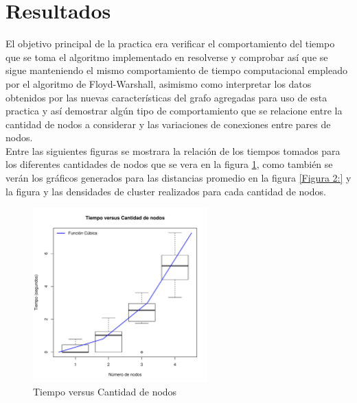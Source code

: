 \documentclass[12pt]{article}
\begin{document}
\section{Resultados}
El objetivo principal de la practica era verificar el comportamiento del tiempo que se toma el algoritmo implementado en resolverse y comprobar así que se sigue manteniendo el mismo comportamiento de tiempo computacional empleado por el algoritmo de Floyd-Warshall, asimismo como interpretar los datos obtenidos por las nuevas características del grafo agregadas para uso de esta practica y así demostrar algún tipo de comportamiento que se relacione entre la cantidad de nodos a considerar y las variaciones de conexiones entre pares de nodos.\\
Entre las siguientes figuras se mostrara la relación de los tiempos tomados para los diferentes cantidades de nodos que se vera en la figura \ref{Figura 1:}, como también se verán los gráficos generados para las distancias promedio en la figura \ref{Figura 2:} y la figura  y las densidades de cluster realizados para cada cantidad de nodos.
\begin{figure}[h!]
	\centering
	\includegraphics[width=0.6\textwidth]{TiempovsN}
	\caption{Tiempo versus Cantidad de nodos\label{Figura 1:}}
\end{figure}
\end{document}
